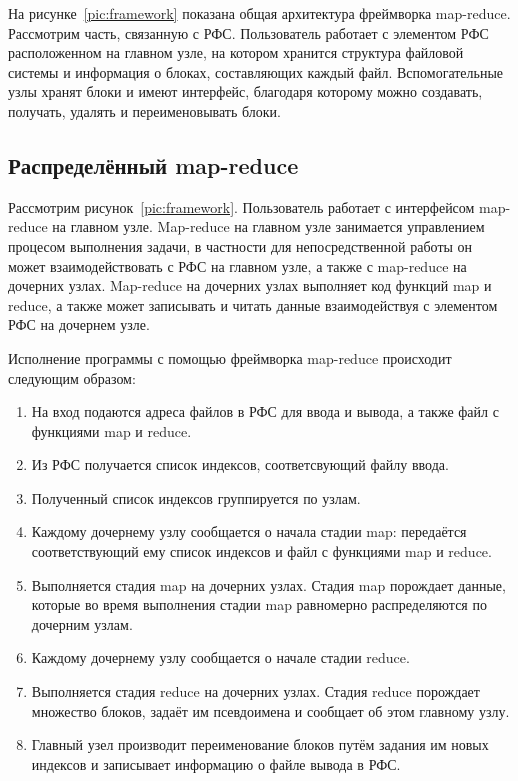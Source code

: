 \documentclass[12pt,a4paper,oneside]{extarticle}
\begin{document}
        На рисунке~\ref{pic:framework} показана общая архитектура фреймворка map-reduce. Рассмотрим часть, связанную с РФС.
        Пользователь работает с элементом РФС расположенном на главном узле, на котором хранится структура файловой системы и информация о блоках, составляющих каждый файл.
        Вспомогательные узлы хранят блоки и имеют интерфейс, благодаря которому можно создавать, получать, удалять и переименовывать блоки.
    \clearpage
    \subsection{Распределённый map-reduce}
        Рассмотрим рисунок~\ref{pic:framework}. Пользователь работает с интерфейсом map-reduce на главном узле. Map-reduce на главном узле занимается управлением процесом выполнения задачи, в частности для непосредственной работы он может взаимодействовать с РФС на главном узле, а также с map-reduce на дочерних узлах. Map-reduce на дочерних узлах выполняет код функций map и reduce, а также может записывать и читать данные взаимодействуя с элементом РФС на дочернем узле.

        Исполнение программы с помощью фреймворка map-reduce происходит следующим образом:
        \begin{enumerate}
            \item На вход подаются адреса файлов в РФС для ввода и вывода, а также файл с функциями map и reduce.
            \item Из РФС получается список индексов, соответсвующий файлу ввода.
            \item Полученный список индексов группируется по узлам.
            \item Каждому дочернему узлу сообщается о начала стадии map: передаётся соответствующий ему список индексов и файл с функциями map и reduce.
            \item Выполняется стадия map на дочерних узлах. Стадия map порождает данные, которые во время выполнения стадии map равномерно распределяются по дочерним узлам.
            \item Каждому дочернему узлу сообщается о начале стадии reduce.
            \item Выполняется стадия reduce на дочерних узлах. Стадия reduce порождает множество блоков, задаёт им псевдоимена и сообщает об этом главному узлу.
            \item Главный узел производит переименование блоков путём задания им новых индексов и записывает информацию о файле вывода в РФС.
        \end{enumerate}
        
\end{document}
